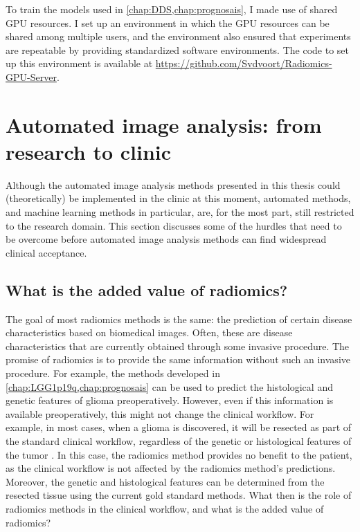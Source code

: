To train the models used in \cref{chap:DDS,chap:prognosais}, I made use of shared GPU resources.
I set up an environment in which the GPU resources can be shared among multiple users, and the environment also ensured that experiments are repeatable by providing standardized software environments.
The code to set up this environment is available at \url{https://github.com/Svdvoort/Radiomics-GPU-Server}.




\section{Automated image analysis: from research to clinic}\label{sec:discussion_clinical}

Although the automated image analysis methods presented in this thesis could (theoretically) be implemented in the clinic at this moment, automated methods, and machine learning methods in particular, are, for the most part, still restricted to the research domain.
This section discusses some of the hurdles that need to be overcome before automated image analysis methods can find widespread clinical acceptance.

\subsection{What is the added value of radiomics?}\label{subsec:discussion_added_value_radiomics}

The goal of most radiomics methods is the same: the prediction of certain disease characteristics based on biomedical images.
Often, these are disease characteristics that are currently obtained through some invasive procedure.
The promise of radiomics is to provide the same information without such an invasive procedure.
For example, the methods developed in \cref{chap:LGG1p19q,chap:prognosais} can be used to predict the histological and genetic features of glioma preoperatively.
However, even if this information is available preoperatively, this might not change the clinical workflow.
For example, in most cases, when a glioma is discovered, it will be resected as part of the standard clinical workflow, regardless of the genetic or histological features of the \gls{tumor} \autocite{welle2017EANO,stupp2014hggguidelines}.
In this case, the radiomics method provides no benefit to the patient, as the clinical workflow is not affected by the radiomics method's predictions.
Moreover, the genetic and histological features can be determined from the resected tissue using the current gold standard methods.
What then is the role of radiomics methods in the clinical workflow, and what is the added value of radiomics?

